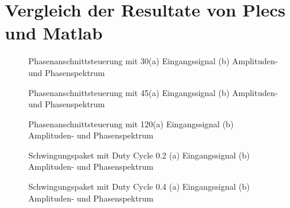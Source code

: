 \begin{appendix}
\begin{lstlisting}[language=Arduino]
\end{lstlisting}

\newpage
\section{Vergleich der Resultate von Plecs und Matlab}\label{sec:Vergleich_der_Resultate}

\begin{figure}[ht!]
	\centering
	\qquad
	\caption{Phasenanschnittsteuerung mit 30\textdegree (a) Eingangssignal (b) Amplituden- und Phasenspektrum}
	\label{fig:Phasenanschnittsteuerung_mit_30}
\end{figure}

\begin{figure}[ht!]
	\centering
	\qquad
	\caption{Phasenanschnittsteuerung mit 45\textdegree (a) Eingangssignal (b) Amplituden- und Phasenspektrum}
	\label{fig:Phasenanschnittsteuerung_mit_45}
\end{figure}

\begin{figure}[ht!]
	\centering
	\qquad
	\caption{Phasenanschnittsteuerung mit 120\textdegree (a) Eingangssignal (b) Amplituden- und Phasenspektrum}
	\label{fig:Phasenanschnittsteuerung_mit_120}
\end{figure}

\newpage

\begin{figure}[ht!]
	\centering
	\qquad
	\caption{Schwingungspaket mit Duty Cycle 0.2 (a) Eingangssignal (b) Amplituden- und Phasenspektrum}
	\label{fig:Schwingungspaketsteuerung_mit_duty_cycle_0_2}
\end{figure}


\begin{figure}[ht!]
	\centering
	\qquad
	\caption{Schwingungspaket mit Duty Cycle 0.4 (a) Eingangssignal (b) Amplituden- und Phasenspektrum}
	\label{fig:Schwingungspaketsteuerung_mit_duty_cycle_0_4}
\end{figure}


\end{appendix}
